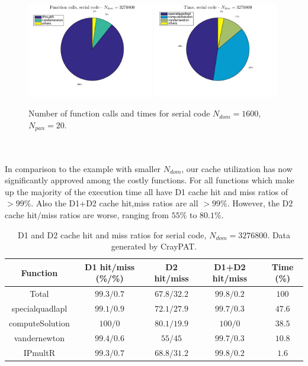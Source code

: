\documentclass[a4paper,10pt]{article}
\begin{document}
\begin{figure}[ht]
    \begin{center}
        \includegraphics[width=0.49\textwidth]{Graphics/craypat_serial_batch10_calls_pie.png}
        \includegraphics[width=0.49\textwidth]{Graphics/craypat_serial_batch10_time_pie.png}
    \end{center}
    \caption{Number of function calls and times for serial code $N_{dom} = 1600$, $N_{pan} = 20$.}
    \label{fig:batch10_serial_pie}
\end{figure} \\ \\
In comparison to the example with smaller $N_{dom}$, our cache utilization has now significantly approved among the costly functions. For all functions which make up the majority of the execution time all have D1 cache hit and miss ratios of $>99\%$. Also the D1+D2 cache hit,miss ratios are all $>99\%$. However, the D2 cache hit$/$miss ratios are worse, ranging from $55\%$ to $80.1\%$. 
\begin{table}[ht]
\begin{center}
    \begin{tabular}{ c | c | c | c | c }
        Function & D1 hit/miss (\%/\%) & D2 hit/miss & D1+D2 hit/miss & Time (\%) \\ \hline
        Total & $99.3/0.7$ & $67.8/32.2$ & $99.8/0.2$ & $100$ \\ 
        specialquadlapl & $99.1/0.9$ & $72.1/27.9$ & $99.7/0.3$ & $47.6$ \\
        computeSolution & $100/0$ & $80.1/19.9$ & $100/0$ & $38.5$ \\
        vandernewton & $99.4/0.6$ & $55/45$ & $99.7/0.3$ & $10.8$ \\
        IPmultR & $99.3/0.7$ & $68.8/31.2$ & $99.8/0.2$ & $1.6$
    \end{tabular}
    \caption{D1 and D2 cache hit and miss ratios for serial code, $N_{dom} = 3276800$. Data generated by CrayPAT.}
    \label{tab:batch10_serial_caches}
\end{center}
\end{table}  
\end{document}
